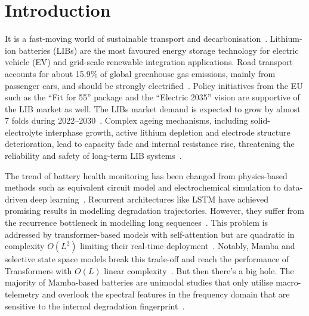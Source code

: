 \section{Introduction}
\label{sec:introduction}

It is a fast-moving world of sustainable transport and
decarbonisation~\cite{iea2023}. Lithium-ion batteries (LIBs) are the most
favoured energy storage technology for electric vehicle (EV) and grid-scale
renewable integration applications. Road transport accounts for about 15.9\% of
global greenhouse gas emissions, mainly from passenger cars, and should be
strongly electrified~\cite{crippa2024}. Policy initiatives from the EU such as
the ``Fit for 55'' package and the ``Electric 2035'' vision are supportive of
the LIB market as well. The LIBs market demand is expected to grow by almost 7
folds during 2022--2030~\cite{statista2026}. Complex ageing mechanisms,
including solid-electrolyte interphase growth, active lithium depletion and
electrode structure deterioration, lead to capacity fade and internal resistance
rise, threatening the reliability and safety of long-term LIB
systems~\cite{meng2026,richardson2017}.

The trend of battery health monitoring has been changed from physics-based
methods such as equivalent circuit model and electrochemical simulation to
data-driven deep learning~\cite{ghafari2023}. Recurrent architectures like LSTM
have achieved promising results in modelling degradation trajectories. However,
they suffer from the recurrence bottleneck in modelling long
sequences~\cite{yao2021,zhao2024}. This problem is addressed by
transformer-based models with self-attention but are quadratic in complexity
$O(L^{2})$ limiting their real-time deployment~\cite{patel2025}. Notably, Mamba
and selective state space models break this trade-off and reach the performance
of Transformers with $O(L)$ linear complexity~\cite{gu2023}. But then there's a
big hole. The majority of Mamba-based batteries are unimodal studies that only
utilise macro-telemetry and overlook the spectral features in the frequency
domain that are sensitive to the internal degradation
fingerprint~\cite{alsmadi2025,meng2026,olalde2024}.

